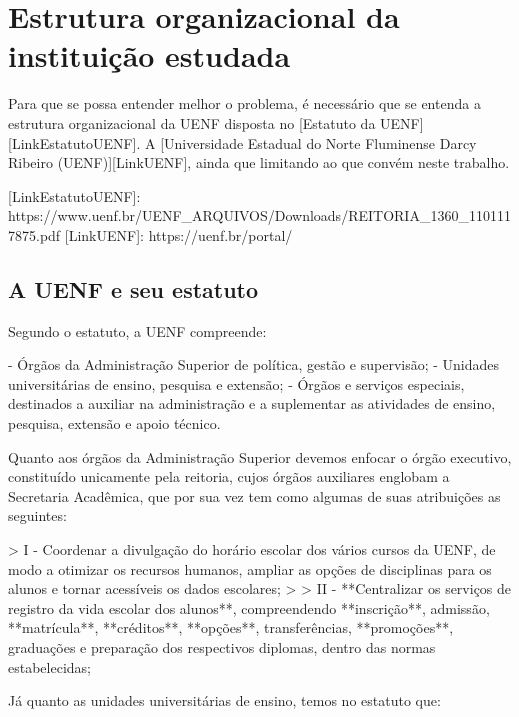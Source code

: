 \chapter{Estrutura organizacional da instituição estudada} %

Para que se possa entender melhor o problema, é necessário que se entenda a estrutura organizacional da UENF disposta no [Estatuto da UENF][LinkEstatutoUENF]. A [Universidade Estadual do Norte Fluminense Darcy Ribeiro (UENF)][LinkUENF], ainda que limitando ao que convém neste trabalho.

[LinkEstatutoUENF]: https://www.uenf.br/UENF_ARQUIVOS/Downloads/REITORIA_1360_1101117875.pdf
[LinkUENF]: https://uenf.br/portal/

\section{A UENF e seu estatuto} %


    Segundo o estatuto, a UENF compreende:

    - Órgãos da Administração Superior de política, gestão e supervisão;
    - Unidades universitárias de ensino, pesquisa e extensão;
    - Órgãos e serviços especiais, destinados a auxiliar na administração e a suplementar as atividades de ensino, pesquisa, extensão e apoio técnico.

    Quanto aos órgãos da Administração Superior devemos enfocar o órgão executivo, constituído unicamente pela reitoria, cujos órgãos auxiliares englobam a Secretaria Acadêmica, que por sua vez tem como algumas de suas atribuições as seguintes:

    > I - Coordenar a divulgação do horário escolar dos vários cursos da UENF, de modo a otimizar os recursos humanos, ampliar as opções de disciplinas para os alunos e tornar acessíveis os dados escolares;
    >
    > II - **Centralizar os serviços de registro da vida escolar dos alunos**, compreendendo **inscrição**, admissão, **matrícula**, **créditos**, **opções**, transferências, **promoções**, graduações e preparação dos respectivos diplomas, dentro das normas estabelecidas;

    Já quanto as unidades universitárias de ensino, temos no estatuto que:

